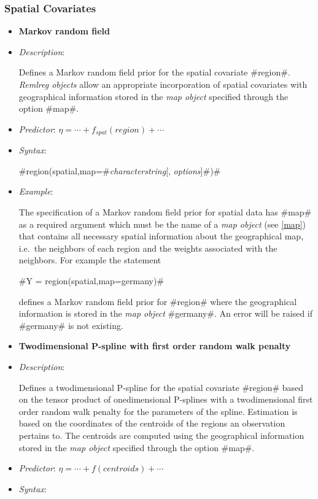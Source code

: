 \subsubsection*{Spatial Covariates}

\begin{itemize}
\item[]{\bf\sffamily Markov random field}

\item[] {\em Description}:

Defines a Markov random field prior for the spatial covariate
#region#. {\em Remlreg objects} allow an appropriate incorporation
of spatial covariates with geographical information stored in the
{\em map object} specified through the option #map#.
\item[] {\em Predictor}: $\eta = \cdots + f_{spat}(region) + \cdots$
\item[] {\em Syntax}:

#region(spatial,map=#{\em characterstring}[, {\em options}]#)#
\item[] {\em Example}:

The specification of a Markov random field prior for spatial data
has #map# as a required argument which must be the name of a {\em
map object} (see \autoref{map}) that contains all necessary
spatial information about the geographical map, i.e.~the neighbors
of each region and the weights associated with the neighbors. For
example the statement

#Y = region(spatial,map=germany)#

defines a Markov random field prior for #region# where the
geographical information is stored in the {\em map object}
#germany#. An error will be raised if #germany# is not existing.

\item[]{\bf\sffamily Twodimensional P-spline with first order
random walk penalty}

\item[] {\em Description}:

Defines a twodimensional P-spline for the spatial covariate #region#
based on the tensor product of onedimensional P-splines with a
twodimensional first order random walk penalty for the parameters of
the spline. Estimation is based on the coordinates of the centroids
of the regions an observation pertains to. The centroids are
computed using the geographical information stored in the {\em map
object} specified through the option #map#.
\item[] {\em Predictor}: $\eta= \cdots + f(centroids) + \cdots$
\item[] {\em Syntax}:


\end{itemize}
